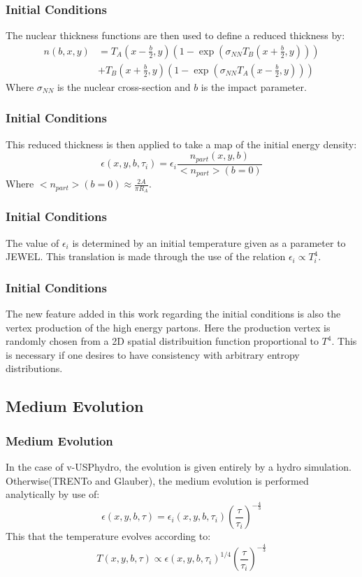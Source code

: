 \documentclass{beamer}
\begin{document}
\begin{frame}\frametitle{Initial Conditions}
	The nuclear thickness functions are then used to define a reduced thickness by:
	\begin{equation}
	\begin{split}
	n(b,x,y) &= T_A(x-\frac{b}{2},y) \left( 1-\exp\left( \sigma_{NN} T_B(x+\frac{b}{2},y) \right) \right) \\
	&+ T_B(x+\frac{b}{2},y) \left( 1-\exp\left( \sigma_{NN} T_A(x-\frac{b}{2},y) \right) \right)
	\end{split}
	\end{equation}
	Where $\sigma_{NN}$ is the nuclear cross-section and $b$ is the impact parameter.
\end{frame}

\begin{frame}\frametitle{Initial Conditions}
	This reduced thickness is then applied to take a map of the initial energy density:
	\begin{equation}
	\epsilon(x,y,b,\tau_i) = \epsilon_i \frac{n_{part}(x,y,b)}{<n_{part}>(b=0)}
	\end{equation}
	Where $<n_{part}>(b=0) \approx \frac{2 A}{\pi R_A}$.
\end{frame}

\begin{frame}\frametitle{Initial Conditions}
	The value of $\epsilon_i$ is determined by an initial temperature given as a parameter to
	JEWEL. This translation is made through the use of the relation $\epsilon_i \propto T_i^4$.
\end{frame}

\begin{frame}\frametitle{Initial Conditions}
	The new feature added in this work regarding the initial conditions is also the
	vertex production of the high energy partons. Here the production vertex is randomly
	chosen from a 2D spatial distribuition function proportional to $T^4$. This is necessary
	if one desires to have consistency with arbitrary entropy distributions.
\end{frame}

\subsection{Medium Evolution}

\begin{frame}\frametitle{Medium Evolution}
	In the case of v-USPhydro, the evolution is given entirely by a hydro simulation.
	Otherwise(TRENTo and Glauber), the medium evolution is performed analytically by use of:
	\begin{equation}
	\epsilon(x,y,b,\tau) = \epsilon_i (x,y,b,\tau_i) \left( \frac{\tau}{\tau_i} \right)^{-\frac{4}{3}}
	\end{equation}
	\pause
	This that the temperature evolves according to:
	\begin{equation}
	T(x,y,b,\tau) \propto \epsilon(x,y,b,\tau_i)^{1/4} \left( \frac{\tau}{\tau_i} \right)^{-\frac{4}{3}}
	\end{equation}
\end{frame}
\end{document}

